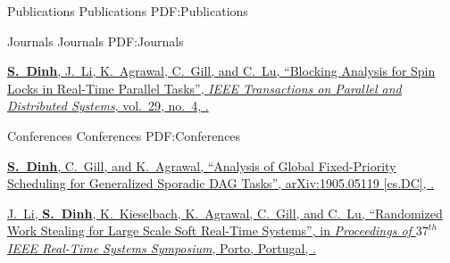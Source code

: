 \documentclass[letterpaper,MMMyyyy,nonstopmode]{simpleresumecv}
\begin{document}
\begin{Body}

\Section
{Publications}
{Publications}
{PDF:Publications}

\SubSection
{Journals}
{Journals}
{PDF:Journals}

\begingroup
\renewcommand{\MaxNumberedItem}{[100]}

\BigGap
\NumberedItem{[1]}
\href{https://ieeexplore.ieee.org/document/8122044/}
{\textbf{S.~Dinh}, J.~Li, K.~Agrawal, C.~Gill, and C.~Lu,
``Blocking Analysis for Spin Locks in Real-Time Parallel Tasks'',
\textit{IEEE Transactions on Parallel and Distributed Systems},
vol.~29,
no.~4,
.}


\endgroup

\BigGap
\SubSection
{Conferences}
{Conferences}
{PDF:Conferences}

\begingroup
\renewcommand{\MaxNumberedItem}{[100]}

\BigGap
\NumberedItem{[1]}
\href{https://arxiv.org/abs/1905.05119}
{\textbf{S.~Dinh}, C.~Gill, and K.~Agrawal,
``Analysis of Global Fixed-Priority Scheduling for Generalized Sporadic DAG Tasks'', 
arXiv:1905.05119 [cs.DC],
.}

\Gap
\NumberedItem{[2]}
\href{https://ieeexplore.ieee.org/document/7809856/}
{J.~Li, \textbf{S.~Dinh}, K.~Kieselbach, K.~Agrawal, C.~Gill, and C.~Lu,
``Randomized Work Stealing for Large Scale Soft Real-Time Systems'',
in \textit{Proceedings of $37^{th}$ IEEE Real-Time Systems Symposium},
Porto, Portugal,
.}




\end{Body}
\end{document}
